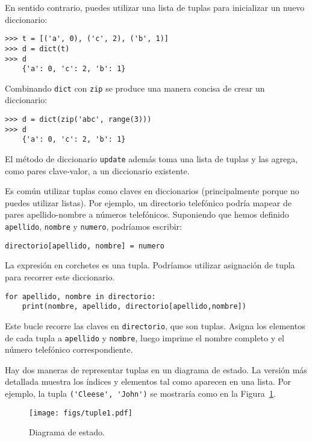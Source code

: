 \documentclass[10pt]{book}
\begin{document}
En sentido contrario, puedes utilizar una lista de tuplas para
inicializar un nuevo diccionario: 

\begin{verbatim}
>>> t = [('a', 0), ('c', 2), ('b', 1)]
>>> d = dict(t)
>>> d
    {'a': 0, 'c': 2, 'b': 1}
\end{verbatim}

Combinando {\tt dict} con {\tt zip} se produce una manera concisa
de crear un diccionario:

\begin{verbatim}
>>> d = dict(zip('abc', range(3)))
>>> d
    {'a': 0, 'c': 2, 'b': 1}
\end{verbatim}
%
El método de diccionario {\tt update} además toma una lista de tuplas
y las agrega, como pares clave-valor, a un diccionario existente.

Es común utilizar tuplas como claves en diccionarios (principalmente porque
no puedes utilizar listas).  Por ejemplo, un directorio telefónico podría mapear
de pares apellido-nombre a números telefónicos.  Suponiendo
que hemos definido {\tt apellido}, {\tt nombre} y {\tt numero},
podríamos escribir:

\begin{verbatim}
directorio[apellido, nombre] = numero
\end{verbatim}
%
La expresión en corchetes es una tupla.  Podríamos utilizar asignación
de tupla para recorrer este diccionario.

\begin{verbatim}
for apellido, nombre in directorio:
    print(nombre, apellido, directorio[apellido,nombre])
\end{verbatim}
%
Este bucle recorre las claves en {\tt directorio}, que son tuplas.  Asigna
los elementos de cada tupla a {\tt apellido} y {\tt nombre}, luego
imprime el nombre completo y el número telefónico correspondiente.

Hay dos maneras de representar tuplas en un diagrama de estado.  La versión
más detallada muestra los índices y elementos tal como aparecen en
una lista.  Por ejemplo, la tupla \verb"('Cleese', 'John')" se mostraría
como en la Figura~\ref{fig.tuple1}.

\begin{figure}
\centerline
{\texttt{[image: figs/tuple1.pdf]}}
\caption{Diagrama de estado.}
\label{fig.tuple1}
\end{figure}
\end{document}
